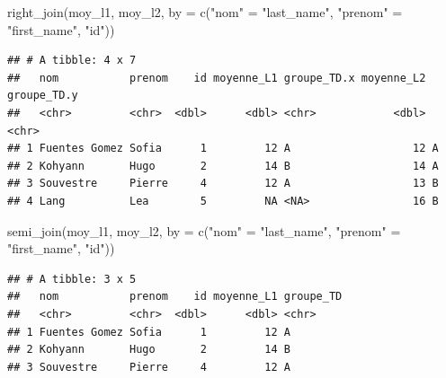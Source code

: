 \documentclass[
  11pt,
]{book}
\newcommand{\VERB}{\Verb[commandchars=\\\{\}]}
\newenvironment{Shaded}{\begin{snugshade}}{\end{snugshade}}
\newcommand{\AttributeTok}[1]{\textcolor[rgb]{0.77,0.63,0.00}{#1}}
\newcommand{\FunctionTok}[1]{\textcolor[rgb]{0.00,0.00,0.00}{#1}}
\newcommand{\NormalTok}[1]{#1}
\newcommand{\OtherTok}[1]{\textcolor[rgb]{0.56,0.35,0.01}{#1}}
\newcommand{\StringTok}[1]{\textcolor[rgb]{0.31,0.60,0.02}{#1}}
\providecommand{\tightlist}{%
  \setlength{\itemsep}{0pt}\setlength{\parskip}{0pt}}
\numberwithin{equation}{section}
\numberwithin{countremarque}{section}
\begin{document}
\begin{Shaded}
\begin{Highlighting}[]
\FunctionTok{right\_join}\NormalTok{(moy\_l1, moy\_l2,}
           \AttributeTok{by =} \FunctionTok{c}\NormalTok{(}\StringTok{"nom"} \OtherTok{=} \StringTok{"last\_name"}\NormalTok{, }\StringTok{"prenom"} \OtherTok{=} \StringTok{"first\_name"}\NormalTok{, }\StringTok{"id"}\NormalTok{))}
\end{Highlighting}
\end{Shaded}

\begin{lstlisting}
## # A tibble: 4 x 7
##   nom           prenom    id moyenne_L1 groupe_TD.x moyenne_L2 groupe_TD.y
##   <chr>         <chr>  <dbl>      <dbl> <chr>            <dbl> <chr>      
## 1 Fuentes Gomez Sofia      1         12 A                   12 A          
## 2 Kohyann       Hugo       2         14 B                   14 A          
## 3 Souvestre     Pierre     4         12 A                   13 B          
## 4 Lang          Lea        5         NA <NA>                16 B
\end{lstlisting}


\begin{Shaded}
\begin{Highlighting}[]
\FunctionTok{semi\_join}\NormalTok{(moy\_l1, moy\_l2,}
          \AttributeTok{by =} \FunctionTok{c}\NormalTok{(}\StringTok{"nom"} \OtherTok{=} \StringTok{"last\_name"}\NormalTok{, }\StringTok{"prenom"} \OtherTok{=} \StringTok{"first\_name"}\NormalTok{, }\StringTok{"id"}\NormalTok{))}
\end{Highlighting}
\end{Shaded}

\begin{lstlisting}
## # A tibble: 3 x 5
##   nom           prenom    id moyenne_L1 groupe_TD
##   <chr>         <chr>  <dbl>      <dbl> <chr>    
## 1 Fuentes Gomez Sofia      1         12 A        
## 2 Kohyann       Hugo       2         14 B        
## 3 Souvestre     Pierre     4         12 A
\end{lstlisting}
\end{document}
